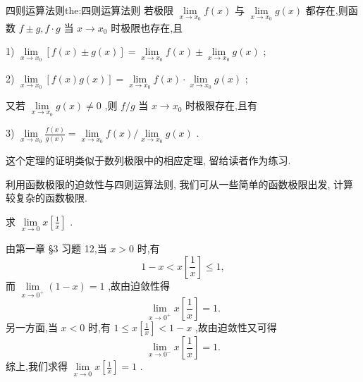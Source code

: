 \begin{theorem}{四则运算法则}{the:四则运算法则}
若极限 \(\mathop{\lim }\limits_{{x \rightarrow  {x}_{0}}}f\left( x\right)\) 与 \(\mathop{\lim }\limits_{{x \rightarrow  {x}_{0}}}g\left( x\right)\) 都存在,则函数 \(f \pm  g,f \cdot  g\) 当 \(x \rightarrow  {x}_{0}\) 时极限也存在,且

1) \(\mathop{\lim }\limits_{{x \rightarrow  {x}_{0}}}\left\lbrack  {f\left( x\right)  \pm  g\left( x\right) }\right\rbrack   = \mathop{\lim }\limits_{{x \rightarrow  {x}_{0}}}f\left( x\right)  \pm  \mathop{\lim }\limits_{{x \rightarrow  {x}_{0}}}g\left( x\right)\) ;

2) \(\mathop{\lim }\limits_{{x \rightarrow  {x}_{0}}}\left\lbrack  {f\left( x\right) g\left( x\right) }\right\rbrack   = \mathop{\lim }\limits_{{x \rightarrow  {x}_{0}}}f\left( x\right)  \cdot  \mathop{\lim }\limits_{{x \rightarrow  {x}_{0}}}g\left( x\right)\) ;

又若 \(\mathop{\lim }\limits_{{x \rightarrow  {x}_{0}}}g\left( x\right)  \neq  0\) ,则 \(f/g\) 当 \(x \rightarrow  {x}_{0}\) 时极限存在,且有

3) \(\mathop{\lim }\limits_{{x \rightarrow  {x}_{0}}}\frac{f\left( x\right) }{g\left( x\right) } = \mathop{\lim }\limits_{{x \rightarrow  {x}_{0}}}f\left( x\right) /\mathop{\lim }\limits_{{x \rightarrow  {x}_{0}}}g\left( x\right)\) .
\end{theorem}

这个定理的证明类似于数列极限中的相应定理, 留给读者作为练习.

利用函数极限的迫敛性与四则运算法则, 我们可从一些简单的函数极限出发, 计算较复杂的函数极限.

\begin{example}
求 \(\mathop{\lim }\limits_{{x \rightarrow  0}}x\left\lbrack  \frac{1}{x}\right\rbrack\) .
\end{example}


\begin{solution}
由第一章 §3 习题 12,当 \(x > 0\) 时,有
\[
1 - x < x\left\lbrack  \frac{1}{x}\right\rbrack   \leq  1,
\]
而 \(\mathop{\lim }\limits_{{x \rightarrow  {0}^{ + }}}\left( {1 - x}\right)  = 1\) ,故由迫敛性得
\[
\mathop{\lim }\limits_{{x \rightarrow  {0}^{ + }}}x\left\lbrack  \frac{1}{x}\right\rbrack   = 1.
\]
另一方面,当 \(x < 0\) 时,有 \(1 \leq  x\left\lbrack  \frac{1}{x}\right\rbrack   < 1 - x\) ,故由迫敛性又可得
\[
\mathop{\lim }\limits_{{x \rightarrow  {0}^{ - }}}x\left\lbrack  \frac{1}{x}\right\rbrack   = 1.
\]
综上,我们求得 \(\mathop{\lim }\limits_{{x \rightarrow  0}}x\left\lbrack  \frac{1}{x}\right\rbrack   = 1\) .
\end{solution}


